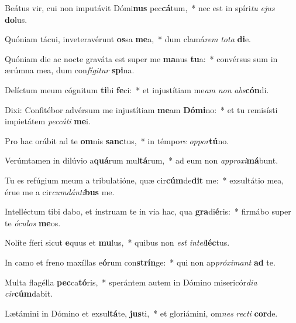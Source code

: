 \item Beátus vir, cui non imputávit Dómi\textbf{nus} pec\textbf{cá}tum,~* nec est in spíri\textit{tu} \textit{e}\textit{jus} \textbf{do}lus.
\item Quóniam tácui, inveteravérunt \textbf{os}sa \textbf{me}a,~* dum clamá\textit{rem} \textit{to}\textit{ta} \textbf{di}e.
\item Quóniam die ac nocte graváta est super me \textbf{ma}nus \textbf{tu}a:~* convérsus sum in ærúmna mea, dum con\textit{fí}\textit{gi}\textit{tur} \textbf{spi}na.
\item Delíctum meum cógnitum \textbf{ti}bi \textbf{fe}ci:~* et injustítiam me\textit{am} \textit{non} \textit{abs}\textbf{cón}di.
\item Dixi: Confitébor advérsum me injustítiam \textbf{me}am \textbf{Dó}\textbf{mi}no:~* et tu remisísti impietátem \textit{pec}\textit{cá}\textit{ti} \textbf{me}i.
\item Pro hac orábit ad te \textbf{om}nis \textbf{sanc}tus,~* in témpo\textit{re} \textit{op}\textit{por}\textbf{tú}no.
\item Verúmtamen in dilúvio a\textbf{quá}rum mul\textbf{tá}rum,~* ad eum non \textit{ap}\textit{pro}\textit{xi}\textbf{má}bunt.
\item Tu es refúgium meum a tribulatióne, quæ cir\textbf{cúm}de\textbf{dit} me:~* exsultátio mea, érue me a cir\textit{cum}\textit{dán}\textit{ti}\textbf{bus} me.
\item Intelléctum tibi dabo, et ínstruam te in via hac, qua \textbf{gra}di\textbf{é}ris:~* firmábo super te \textit{ó}\textit{cu}\textit{los} \textbf{me}os.
\item Nolíte fíeri sicut \textbf{e}quus et \textbf{mu}lus,~* quibus non \textit{est} \textit{in}\textit{tel}\textbf{léc}tus.
\item In camo et freno maxíllas e\textbf{ó}rum con\textbf{strín}ge:~* qui non ap\textit{pró}\textit{xi}\textit{mant} \textbf{ad} te.
\item Multa flagélla \textbf{pec}ca\textbf{tó}ris,~* sperántem autem in Dómino misericór\textit{di}\textit{a} \textit{cir}\textbf{cúm}dabit.
\item Lætámini in Dómino et exsul\textbf{tá}te, \textbf{jus}ti,~* et gloriámini, om\textit{nes} \textit{rec}\textit{ti} \textbf{cor}de.
